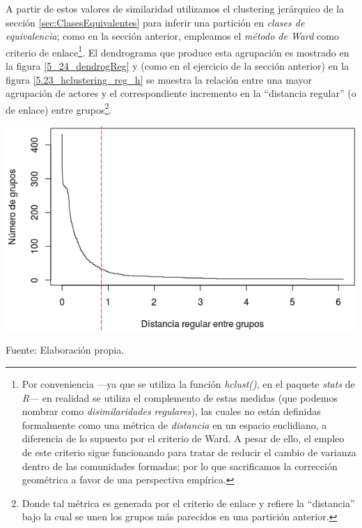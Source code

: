 \documentclass[letterpaper, 11pt]{book}
\theoremstyle{definition}
\theoremstyle{remark}
\begin{document}
A partir de estos valores de similaridad utilizamos el clustering jerárquico de la sección \ref{sec:ClasesEquivalentes} para inferir una partición en \emph{clases de equivalencia}; como en la sección anterior, empleamos el \emph{método de Ward} como criterio de enlace\footnote{
    Por conveniencia ---ya que se utiliza la función \emph{hclust()}, en el paquete \emph{stats} de \emph{R}--- en realidad se utiliza el complemento de estas medidas (que podemos nombrar como \emph{disimilaridades regulares}), las cuales no están definidas formalmente como una métrica de \emph{distancia} en un espacio euclidiano, a diferencia de lo supuesto por el criterio de Ward. 
    A pesar de ello, el empleo de este criterio sigue funcionando para tratar de reducir el cambio de varianza dentro de las comunidades formadas; por lo que sacrificamos la corrección geométrica a favor de una perspectiva empírica.
}. 
El dendrograma que produce esta agrupación es mostrado en la figura \ref{5_24_dendrogReg} y (como en el ejercicio de la sección anterior) en la figura \ref{5.23_hclustering_reg_h} se muestra la relación entre una mayor agrupación de actores y el correspondiente incremento en la ``distancia regular'' (o de enlace) entre grupos\footnote{
    Donde tal métrica es generada por el criterio de enlace y refiere la ``distancia'' bajo la cual se unen los grupos más parecidos en una partición anterior. 
}. 




\begin{minipage}{\linewidth}
\centering
{} \label{5.23_hclustering_reg_h}
\includegraphics[scale=0.68]{img/5.23_hclustering_reg_h.png}
\par\bigskip
\small Fuente: Elaboración propia. 
\end{minipage}\bigskip
\end{document}
